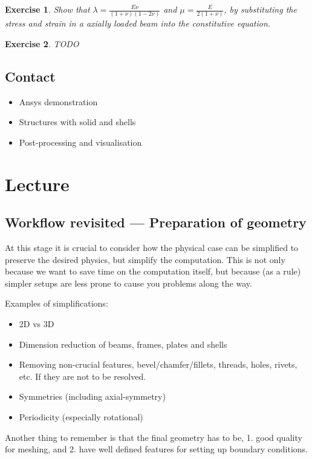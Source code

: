 \documentclass{article}
\newtheorem{exercise}{Exercise}[section]
\begin{document}
\begin{exercise}
Show that $\lambda = \frac{E\nu}{(1+\nu)(1-2\nu)}$ and $\mu=\frac{E}{2(1+\nu)}$, by substituting the stress and strain in a axially loaded beam into the constitutive equation.
\end{exercise}

\begin{exercise}
TODO
\end{exercise}

\subsection*{Contact}
\begin{itemize}
    \item Ansys demonstration
    \item Structures with solid and shells
    \item Post-processing and visualisation
\end{itemize}
\section{Lecture}
\subsection{Workflow revisited --- Preparation of geometry}
At this stage it is crucial to consider how the physical case can be simplified to preserve the desired physics, but simplify the computation. This is not only because we want to save time on the computation itself, but because (as a rule) simpler setups are less prone to cause you problems along the way.

Examples of simplifications:
\begin{itemize}
    \item 2D vs 3D
    \item Dimension reduction of beams, frames, plates and shells
    \item Removing non-crucial features, bevel/chamfer/fillets, threads, holes, rivets, etc. If they are not to be resolved.
    \item Symmetries (including axial-symmetry)
    \item Periodicity (especially rotational)
\end{itemize}

Another thing to remember is that the final geometry has to be, 1. good quality for meshing, and 2. have well defined features for setting up boundary conditions.
\end{document}
